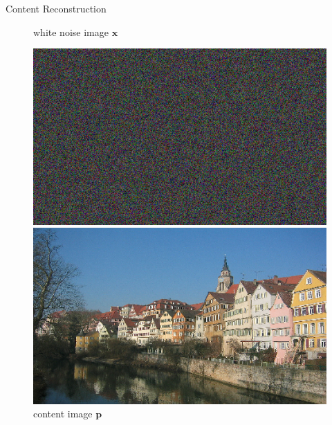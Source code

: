 \documentclass{beamer}
\begin{document}
\begin{frame}{Content Reconstruction}
\begin{figure}[ht]
    \begin{minipage}[b]{0.45\linewidth}
        \centering
        \caption{white noise image $\mathbf{x}$}
        \includegraphics[width=\textwidth]{img/content/noise.png}
    \end{minipage}
    \hspace{0.5cm}
    \begin{minipage}[b]{0.45\linewidth}
        \centering
        \caption{content image $\mathbf{p}$}
        \includegraphics[width=\textwidth]{img/content/tubingen.png}
    \end{minipage}
\end{figure}
\end{frame}
\end{document}
